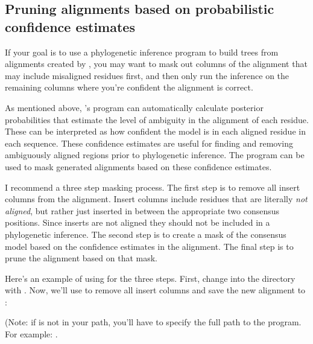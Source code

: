 \begin{comment}
To convert the alignment to fasta format that includes gaps, you can use the
\prog{scripts/stk2aln\_fa.pl} script. 
\end{comment}

\subsection{Pruning alignments based on probabilistic confidence
  estimates}

If your goal is to use a phylogenetic inference program to build trees
from alignments created by , you may want to mask
out columns of the alignment that may include misaligned residues
first, and then only run the inference on the remaining columns where
you're confident the alignment is correct. 

As mentioned above, 's  program
can automatically calculate posterior probabilities that estimate the
level of ambiguity in the alignment of each residue. These can be
interpreted as how confident the model is in each aligned residue in
each sequence. These confidence estimates are useful for finding and
removing ambiguously aligned regions prior to phylogenetic inference.
The  program can be used to mask
 generated alignments based on these confidence estimates.

I recommend a three step masking process. The first step is to remove
all insert columns from the alignment. Insert columns include residues
that are literally \emph{not aligned}, but rather just inserted in
between the appropriate two consensus positions. 
Since inserts are
not aligned they should not be included in a phylogenetic inference.
The second step is to create a mask of the consensus model based on
the confidence estimates in the alignment. The final step is to prune
the alignment based on that mask.

Here's an example of using  for the three steps. 
First, change into the  directory with . 
Now, we'll use  to remove all insert columns and
save the new alignment to :


(Note: if  is not in your path, you'll have to
specify the full path to the program. For example:
.

